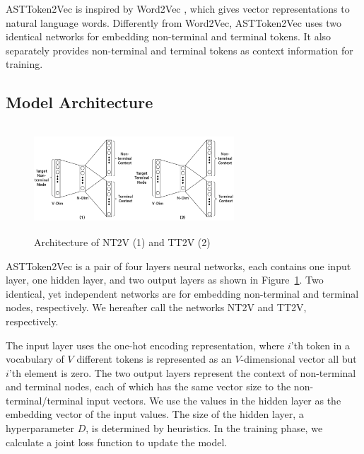 \documentclass[E]{compsoft}
\begin{document}
ASTToken2Vec is inspired by Word2Vec \cite{word2vec}, which gives vector representations to natural language words. Differently from Word2Vec, ASTToken2Vec 
uses two identical networks for embedding non-terminal and terminal tokens.  It also separately provides non-terminal and terminal tokens as context information for training.



\subsection{Model Architecture}
\begin{figure}[!ht]
\centering
\includegraphics[width=7.5cm, height=4cm]{pictures/node2vec_structure.png}
\caption{Architecture of NT2V (1) and TT2V (2)}
\label{fig:node2vec-structure}
\end{figure}
ASTToken2Vec is a pair of four layers neural networks, each contains one input layer, one hidden layer, and two output layers as shown in Figure~\ref{fig:node2vec-structure}.  Two identical, yet independent networks are for embedding non-terminal and terminal nodes, respectively.  We hereafter call the networks NT2V and TT2V, respectively.

The input layer uses the one-hot encoding representation, where $i$'th token in a vocabulary of $V$ different tokens is represented as an $V$-dimensional vector all but $i$'th element is zero.  
The two output layers represent the context of non-terminal and terminal nodes, each of which has the same vector size to the non-terminal/terminal input vectors.
We use the values in the hidden layer as the embedding vector of the input values.  The size of the hidden layer, a hyperparameter $D$, is determined by heuristics.
In the training phase, we calculate a joint loss function to update the model.
\end{document}
